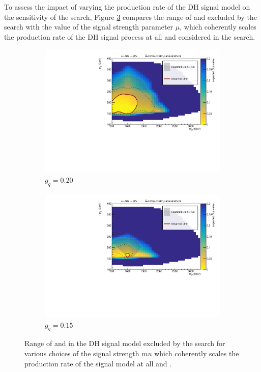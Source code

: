 \label{chapter:appendix_mu_sig}

To assess the impact of varying the production rate of the DH signal model on the sensitivity of the search, Figure \ref{fig:limits_vary_mu_sig} compares the range of \ms and \mZp excluded by the search with the value of the signal strength parameter \(\mu\), which coherently scales the production rate of the DH signal process at all \ms and \mZp considered in the search. 

\begin{figure}[h]
  \centering
  \begin{subfigure}{0.48\textwidth}
    \includegraphics[width=\textwidth]{Figures/8/unblinded_0_20_nosig.pdf}
    \caption{\(g_q=0.20\)}\label{fig:unblinded_0.20}
  \end{subfigure} \hspace{0.3em}
  \begin{subfigure}{0.48\textwidth}
    \includegraphics[width=\textwidth]{Figures/8/unblinded_0_15_nosig.pdf}
    \caption{\(g_q=0.15\)}\label{fig:unblinded_0.15}
  \end{subfigure} \vspace{1em}
  \caption[]{Range of \ms and \mZp in the DH signal model excluded by the search for various choices of the signal strength \(mu\) which coherently scales the production rate of the signal model at all \ms and \mZp.}
  \label{fig:limits_vary_mu_sig}
\end{figure}